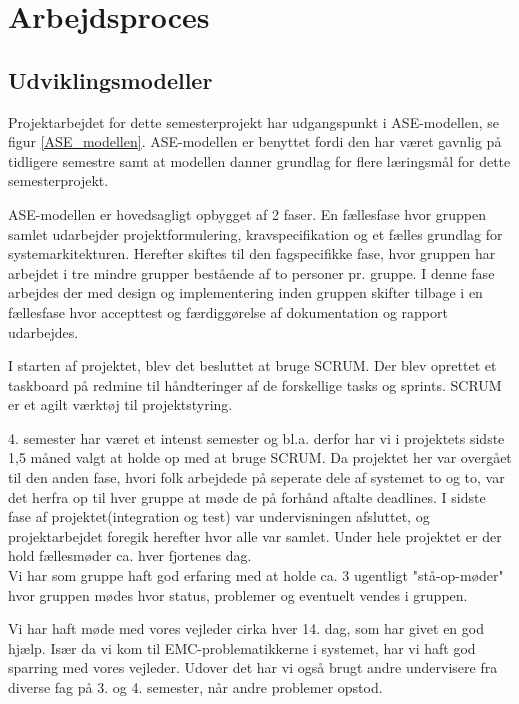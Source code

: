 
\chapter{Arbejdsproces}
\label{arbejdsproces}
\section{Udviklingsmodeller}

Projektarbejdet for dette semesterprojekt har udgangspunkt i ASE-modellen, se figur \ref{ASE_modellen}. ASE-modellen er benyttet fordi den har været gavnlig på tidligere semestre samt at modellen danner grundlag for flere læringsmål for dette semesterprojekt.

ASE-modellen er hovedsagligt opbygget af 2 faser. En fællesfase hvor gruppen samlet udarbejder projektformulering, kravspecifikation og et fælles grundlag for systemarkitekturen. Herefter skiftes til den fagspecifikke fase, hvor gruppen har arbejdet i tre mindre grupper bestående af to personer pr. gruppe. I denne fase arbejdes der med design og implementering inden gruppen skifter tilbage i en fællesfase hvor accepttest og færdiggørelse af dokumentation og rapport udarbejdes. 


I starten af projektet, blev det besluttet at bruge SCRUM. Der blev oprettet et taskboard på redmine til håndteringer af de forskellige tasks og sprints. SCRUM er et agilt værktøj til projektstyring. 

4. semester har været et intenst semester og bl.a. derfor har vi i projektets sidste 1,5 måned valgt at holde op med at bruge SCRUM. Da projektet her var overgået til den anden fase, hvori folk arbejdede på seperate dele af systemet to og to, var det herfra op til hver gruppe at møde de på forhånd aftalte deadlines. I sidste fase af projektet(integration og test) var undervisningen afsluttet, og projektarbejdet foregik herefter hvor alle var samlet. Under hele projektet er der hold fællesmøder ca. hver fjortenes dag.\\
Vi har som gruppe haft god erfaring med at holde ca. 3 ugentligt "stå-op-møder" hvor gruppen mødes hvor status, problemer og eventuelt vendes i gruppen. 

Vi har haft møde med vores vejleder cirka hver 14. dag, som har givet en god hjælp. Især da vi kom til EMC-problematikkerne i systemet, har vi haft god sparring med vores vejleder. Udover det har vi også brugt andre undervisere fra diverse fag på 3. og 4. semester, når andre problemer opstod.

